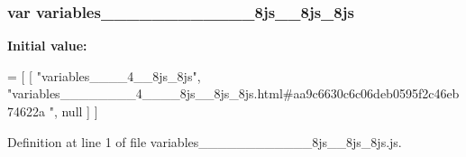 \subsubsection[{variables\+\_\+\+\_\+\+\_\+\+\_\+\+\_\+\+\_\+\+\_\+\+\_\+4\+\_\+\+\_\+\+\_\+\+\_\+8js\+\_\+\+\_\+8js\+\_\+8js}]{\setlength{\rightskip}{0pt plus 5cm}var variables\+\_\+\+\_\+\+\_\+\+\_\+\+\_\+\+\_\+\+\_\+\+\_\+\_\+\+\_\+\+\_\+\+\_\+8js\+\_\+\+\_\+8js\+\_\+8js}\label{variables________________4________8js____8js__8js_8js_a626608df5240cd8eeac3cbc953136c51}
{\bfseries Initial value\+:}
\begin{DoxyCode}
=
[
    [ \textcolor{stringliteral}{"variables\_\_\_\_4\_\_8js\_8js"}, \textcolor{stringliteral}{"variables\_\_\_\_\_\_\_\_4\_\_\_\_8js\_\_8js\_8js.html#aa9c6630c6c06deb0595f2c46eb74622a
      "}, null ]
]
\end{DoxyCode}


Definition at line 1 of file variables\+\_\+\+\_\+\+\_\+\+\_\+\+\_\+\+\_\+\+\_\+\+\_\+\_\+\+\_\+\+\_\+\+\_\+8js\+\_\+\+\_\+8js\+\_\+8js.\+js.

